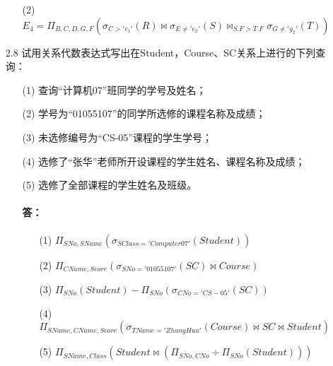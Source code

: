\documentclass[UTF8]{ctexart}
\begin{document}
\begin{itemize}
\begin{enumerate}
		\item[(2)]$E_{4}=\Pi_{B,C,D,G,F}(\sigma_{C>'c_{1}'}(R) \bowtie \sigma_{E \neq 'e_{2}'}(S) \bowtie_{S.F>T.F} \sigma_{G \neq 'g_{2}'}(T))$
	\end{enumerate}

	\item[2.8] 试用关系代数表达式写出在Student，Course、SC关系上进行的下列查询：
	\begin{enumerate}
		\item[(1)] 查询“计算机07”班同学的学号及姓名；
		\item[(2)] 学号为“01055107”的同学所选修的课程名称及成绩；
		\item[(3)] 未选修编号为“CS-05”课程的学生学号；
		\item[(4)] 选修了“张华”老师所开设课程的学生姓名、课程名称及成绩；
		\item[(5)] 选修了全部课程的学生姓名及班级。
		
		\paragraph{答：}
		\begin{enumerate}
			\item[(1)] $\Pi_{SNo, SName}(\sigma_{SClass='Computer 07'}(Student))$
			
			\item[(2)] $\Pi_{CName, Score}(\sigma_{SNo='01055107'}(SC) \bowtie Course)$
			
			\item[(3)] $\Pi_{SNo}(Student) - \Pi_{SNo}(\sigma_{CNo='CS-05'}(SC))$
			
			\item[(4)] $\Pi_{SName, CName, Score}(\sigma_{TName='ZhangHua'}(Course) \bowtie SC \bowtie Student)$
			
			\item[(5)] $\Pi_{SName, Class}(Student \bowtie (\Pi_{SNo, CNo} \div \Pi_{SNo}(Student)))$
		\end{enumerate}
	\end{enumerate}
\end{itemize}
\end{document}
